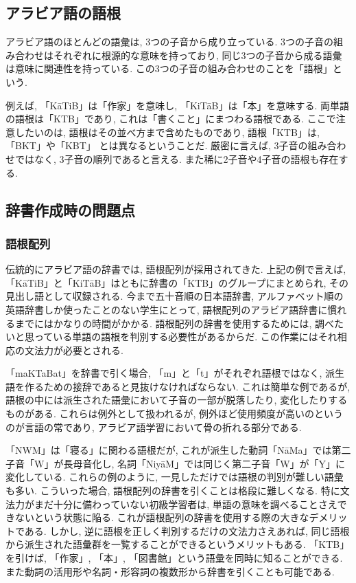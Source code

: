 \documentclass[technicalreport]{ieicej}
\begin{document}
\subsection{アラビア語の語根}
アラビア語のほとんどの語彙は, 3つの子音から成り立っている. 3つの子音の組み合わせはそれぞれに根源的な意味を持っており, 同じ3つの子音から成る語彙は意味に関連性を持っている. この3つの子音の組み合わせのことを「語根」という. 

例えば, 「KāTiB」は「作家」を意味し, 「KiTāB」は「本」を意味する. 両単語の語根は「KTB」であり, これは「書くこと」にまつわる語根である. ここで注意したいのは, 語根はその並べ方まで含めたものであり, 語根「KTB」は, 「BKT」や「KBT」 とは異なるということだ. 厳密に言えば, 3子音の組み合わせではなく, 3子音の順列であると言える. また稀に2子音や4子音の語根も存在する. 

\subsection{辞書作成時の問題点}
\subsubsection{語根配列}
伝統的にアラビア語の辞書では, 語根配列が採用されてきた. 上記の例で言えば, 「KāTiB」と「KiTāB」はともに辞書の「KTB」のグループにまとめられ, その見出し語として収録される. 今まで五十音順の日本語辞書, アルファベット順の英語辞書しか使ったことのない学生にとって, 語根配列のアラビア語辞書に慣れるまでにはかなりの時間がかかる. 語根配列の辞書を使用するためには, 調べたいと思っている単語の語根を判別する必要性があるからだ. この作業にはそれ相応の文法力が必要とされる. 

「maKTaBat」を辞書で引く場合, 「m」と「t」がそれぞれ語根ではなく, 派生語を作るための接辞であると見抜けなければならない. これは簡単な例であるが, 語根の中には派生された語彙において子音の一部が脱落したり, 変化したりするものがある. これらは例外として扱われるが, 例外ほど使用頻度が高いのというのが言語の常であり, アラビア語学習において骨の折れる部分である. 

「NWM」は「寝る」に関わる語根だが, これが派生した動詞「NāMa」では第二子音「W」が長母音化し, 名詞「NiyāM」では同じく第二子音「W」が「Y」に変化している. これらの例のように, 一見しただけでは語根の判別が難しい語彙も多い. こういった場合, 語根配列の辞書を引くことは格段に難しくなる. 特に文法力がまだ十分に備わっていない初級学習者は, 単語の意味を調べることさえできないという状態に陥る. これが語根配列の辞書を使用する際の大きなデメリットである. 
しかし, 逆に語根を正しく判別するだけの文法力さえあれば, 同じ語根から派生された語彙群を一覧することができるというメリットもある.  「KTB」を引けば, 「作家」, 「本」, 「図書館」という語彙を同時に知ることができる. また動詞の活用形や名詞・形容詞の複数形から辞書を引くことも可能である. 
\end{document}
